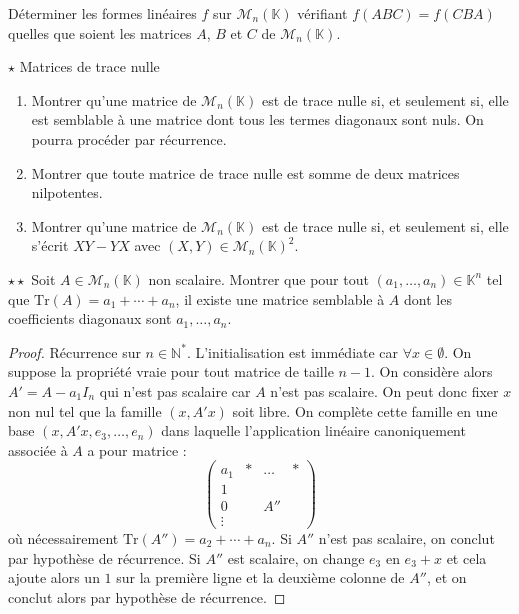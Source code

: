 \documentclass[french,a4paper]{article}
\newcommand{\N}{\mathbb{N}}
\newcommand{\K}{\mathbb{K}}
\newcommand{\st}{^*}
\newcommand{\Tr}{\text{Tr}}
\theoremstyle{plain}
\theoremstyle{definition}
\theoremstyle{remark}
\begin{document}
\begin{ex}{}
	Déterminer les formes linéaires $f$ sur $\mathcal{M}_n(\K)$ vérifiant $f(ABC)=f(CBA)$ quelles que soient les matrices $A$, $B$ et $C$ de $\mathcal{M}_n(\K)$.
\end{ex}

\begin{ex}{$\star$ Matrices de trace nulle}
	\begin{enumerate}
		\item Montrer qu'une matrice de $\mathcal{M}_n(\K)$ est de trace nulle si, et seulement si, elle est semblable à une matrice dont tous les termes diagonaux sont nuls. On pourra procéder par récurrence.
		\item Montrer que toute matrice de trace nulle est somme de deux matrices nilpotentes.
		\item Montrer qu'une matrice de $\mathcal{M}_n(\K)$ est de trace nulle si, et seulement si, elle s'écrit $XY-YX$ avec $(X,Y)\in\mathcal{M}_n(\K)^2$.
	\end{enumerate}
\end{ex}

\begin{ex}{$\star\star$}
	Soit $A\in\mathcal{M}_n(\K)$ non scalaire. Montrer que pour tout $(a_1,\ldots,a_n)\in\K^n$ tel que $\Tr(A)=a_1+\cdots+a_n$, il existe une matrice semblable à $A$ dont les coefficients diagonaux sont $a_1,\ldots,a_n$.
\end{ex}
\begin{proof}
	Récurrence sur $n\in\N\st$. L'initialisation est immédiate car $\forall x\in\emptyset$. On suppose la propriété vraie pour tout matrice de taille $n-1$. On considère alors $A'=A-a_1I_n$ qui n'est pas scalaire car $A$ n'est pas scalaire. On peut donc fixer $x$ non nul tel que la famille $(x,A'x)$ soit libre. On complète cette famille en une base $(x,A'x,e_3,\ldots,e_n)$ dans laquelle l'application linéaire canoniquement associée à $A$ a pour matrice : $$\begin{pmatrix}
		a_1&*&\ldots&*\\
		1&&&\\
		0&&A''&\\
		\vdots&&&
	\end{pmatrix}$$ où nécessairement $\Tr(A'')=a_2+\cdots+a_n$. Si $A''$ n'est pas scalaire, on conclut par hypothèse de récurrence. Si $A''$ est scalaire, on change $e_3$ en $e_3+x$ et cela ajoute alors un $1$ sur la première ligne et la deuxième colonne de $A''$, et on conclut alors par hypothèse de récurrence.
\end{proof}
\end{document}

